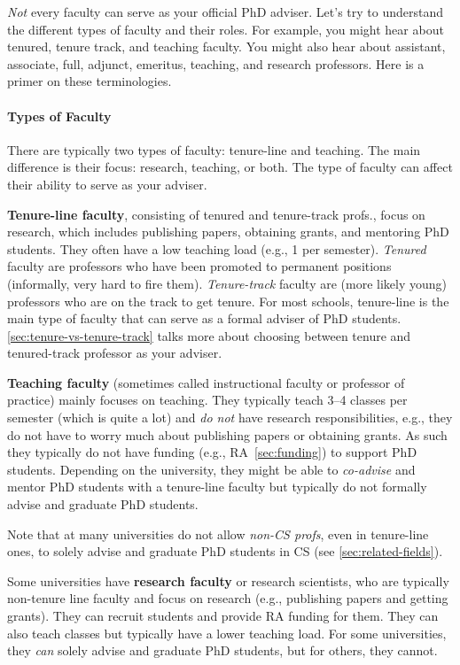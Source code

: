 \documentclass[oneside,11pt,dvipsnames]{book}
\begin{document}
\emph{Not} every faculty can serve as your official PhD adviser. Let's try to understand the different types of faculty and their roles. For example, you might hear about tenured,  tenure track, and teaching faculty.  You might also hear about assistant, associate, full, adjunct, emeritus, teaching, and research professors. Here is a primer on these terminologies.

\paragraph{Types of Faculty} There are typically two types of faculty: tenure-line and teaching.  The main difference is their focus: research, teaching, or both.  The type of faculty can affect their ability to serve as your adviser.

\textbf{Tenure-line faculty}, consisting of tenured and tenure-track profs., focus on research, which includes publishing papers, obtaining grants, and mentoring PhD students.  They often have a low teaching load (e.g., 1 per semester). \emph{Tenured} faculty are professors who have been promoted to permanent positions (informally, very hard to fire them).  \emph{Tenure-track} faculty are (more likely young) professors who are on the track to get tenure.  For most schools, tenure-line is the main type of faculty that can serve as a formal adviser of PhD students. \autoref{sec:tenure-vs-tenure-track} talks more about choosing between tenure and tenured-track professor as your adviser.

\textbf{Teaching faculty} (sometimes called instructional faculty or professor of practice) mainly focuses on teaching. They typically teach 3--4 classes per semester (which is quite a lot) and \emph{do not} have research responsibilities, e.g., they do not have to worry much about publishing papers or obtaining grants. As such they typically do not have funding (e.g., RA~\autoref{sec:funding}) to support PhD students.
Depending on the university, they might be able to \emph{co-advise} and mentor PhD students with a tenure-line faculty but typically do not formally advise and graduate PhD students.

Note that at many universities do not allow \emph{non-CS profs}, even in tenure-line ones, to solely advise and graduate PhD students in CS (see \autoref{sec:related-fields}). 

Some universities have \textbf{research faculty} or research scientists, who are typically non-tenure line faculty and focus on research (e.g., publishing papers and getting grants). 
They can recruit students and provide RA funding for them. 
They can also teach classes but typically have a lower teaching load.
For some universities, they \emph{can} solely advise and graduate PhD students, but for others, they cannot. 
\end{document}
